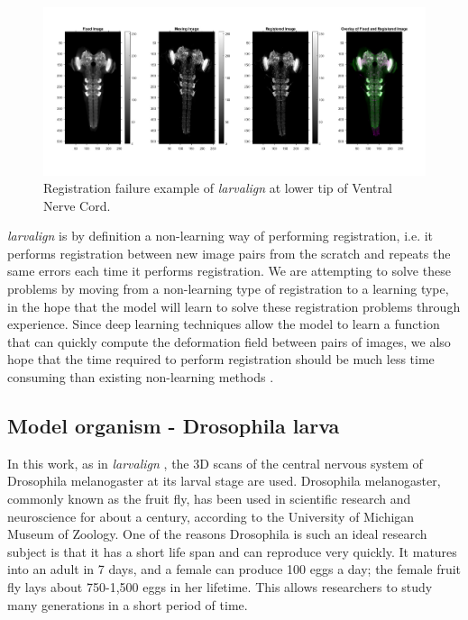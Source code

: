 \documentclass{article}
\begin{document}
	\begin{figure}[H]
		\centering
		\includegraphics[width=\linewidth]{resources/motivation_fig_1.jpg}
		\caption{Registration failure example of \emph{larvalign} at lower tip of Ventral Nerve Cord.}
		\label{fig:Registraion_Failure}
	\end{figure}
	
	\emph{larvalign} is by definition a non-learning way of performing registration, i.e. it performs registration between new image pairs from the scratch and repeats the same errors each time it performs registration. We are attempting to solve these problems by moving from a non-learning type of registration to a learning type, in the hope that the model will learn to solve these registration problems through experience. Since deep learning techniques allow the model to learn a function that can quickly compute the deformation field between pairs of images, we also hope that the time required to perform registration should be much less time consuming than existing non-learning methods \cite{Voxelmorph} \cite{deVos_2018} \cite{Wu_2016} \cite{Yang_2017} \cite{Hessam_2017}.
	
	\subsection{Model organism - Drosophila larva}
	
	In this work, as in \emph{larvalign} \cite{Mu_2018}, the 3D scans of the central nervous system of Drosophila melanogaster at its larval stage are used. Drosophila melanogaster, commonly known as the fruit fly, has been used in scientific research and neuroscience for about a century, according to the University of Michigan Museum of Zoology. One of the reasons Drosophila is such an ideal research subject is that it has a short life span and can reproduce very quickly. It matures into an adult in 7 days, and a female can produce 100 eggs a day; the female fruit fly lays about 750-1,500 eggs in her lifetime. This allows researchers to study many generations in a short period of time. \newline
	
\end{document}
